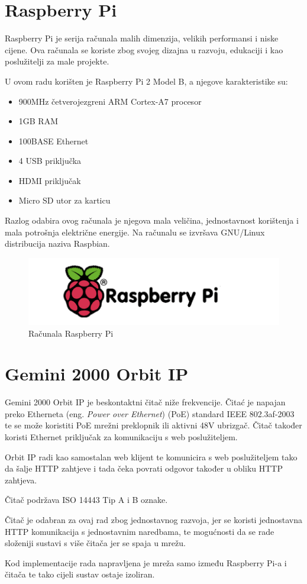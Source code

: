 \documentclass[times, utf8, zavrsni]{fer}
\begin{document}
\section{Raspberry Pi}
Raspberry Pi je serija računala malih dimenzija, velikih performansi i niske cijene. Ova računala se koriste zbog svojeg dizajna u razvoju, edukaciji i kao poslužitelji za male projekte. \par
U ovom radu korišten je Raspberry Pi 2 Model B, a njegove karakteristike su:
\begin{itemize}
\item 900MHz četverojezgreni ARM Cortex-A7 procesor
\item 1GB RAM
\item 100BASE Ethernet
\item 4 USB priključka
\item HDMI priključak
\item Micro SD utor za karticu
\end{itemize}
Razlog odabira ovog računala je njegova mala veličina, jednostavnost korištenja i mala potrošnja električne energije. Na računalu se izvršava GNU/Linux distribucija naziva Raspbian. 

\begin{figure}[h]
\includegraphics[scale=0.8]{pi.png}
\centering
\caption{Računala Raspberry Pi}
\centering
\end{figure}

\section{Gemini 2000 Orbit IP}
Gemini 2000 Orbit IP je beskontaktni čitač niže frekvencije. Čitać je napajan preko Etherneta (eng. \textit{Power over Ethernet}) (PoE) standard IEEE 802.3af-2003 te se može koristiti PoE mrežni preklopnik ili aktivni 48V ubrizgač. Čitač također koristi Ethernet priključak za komunikaciju s web poslužiteljem. \par
Orbit IP radi kao samostalan web klijent te komunicira s web poslužiteljem tako da šalje HTTP zahtjeve i tada čeka povrati odgovor također u obliku HTTP zahtjeva. \par 
Čitač podržava ISO 14443 Tip A i B oznake.\par 
Čitač je odabran za ovaj rad zbog jednostavnog razvoja, jer se koristi jednostavna HTTP komunikacija s jednostavnim naredbama, te mogućnosti da se rade složeniji sustavi s više čitača jer se spaja u mrežu.\par
Kod implementacije rada napravljena je mreža samo između Raspberry Pi-a i čitača te tako cijeli sustav ostaje izoliran.
\end{document}
